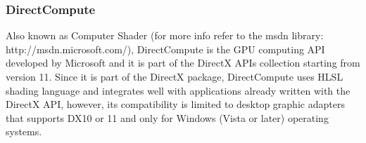 \subsubsection{DirectCompute}
Also known as Computer Shader (for more info refer to the msdn library: http://msdn.microsoft.com/), DirectCompute is the GPU computing API developed by Microsoft and it is part of the DirectX APIs collection starting from version 11.
Since it is part of the DirectX package, DirectCompute uses HLSL shading language and integrates well with applications already written with the DirectX API, however, its compatibility is limited to desktop graphic adapters that supports DX10 or 11 and only for Windows (Vista or later) operating systems.

